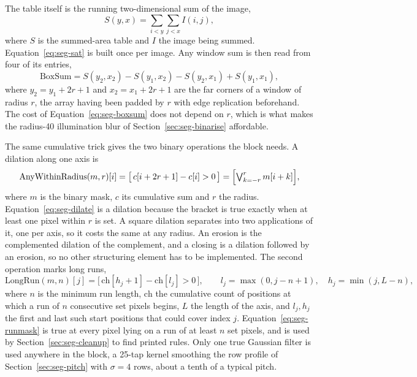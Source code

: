 The table itself is the running two-dimensional sum of the image,
\begin{equation}
S(y,x)=\sum_{i<y}\sum_{j<x} I(i,j),
\label{eq:seg-sat}
\end{equation}
where $S$ is the summed-area table and $I$ the image being summed. Equation~\ref{eq:seg-sat} is built once per image. Any window sum is then read from four of its entries,
\begin{equation}
\mathrm{BoxSum}=S(y_2,x_2)-S(y_1,x_2)-S(y_2,x_1)+S(y_1,x_1),
\label{eq:seg-boxsum}
\end{equation}
where $y_2=y_1+2r+1$ and $x_2=x_1+2r+1$ are the far corners of a window of radius $r$, the array having been padded by $r$ with edge replication beforehand. The cost of Equation~\ref{eq:seg-boxsum} does not depend on $r$, which is what makes the radius-40 illumination blur of Section~\ref{sec:seg-binarise} affordable.

The same cumulative trick gives the two binary operations the block needs. A dilation along one axis is
\begin{equation}
\mathrm{AnyWithinRadius}(m,r)[i]=\bigl[\,c[i+2r+1]-c[i]>0\,\bigr]=\Bigl[\textstyle\bigvee_{k=-r}^{r} m[i+k]\Bigr],
\label{eq:seg-dilate}
\end{equation}
where $m$ is the binary mask, $c$ its cumulative sum and $r$ the radius. Equation~\ref{eq:seg-dilate} is a dilation because the bracket is true exactly when at least one pixel within $r$ is set. A square dilation separates into two applications of it, one per axis, so it costs the same at any radius. An erosion is the complemented dilation of the complement, and a closing is a dilation followed by an erosion, so no other structuring element has to be implemented. The second operation marks long runs,
\begin{equation}
\mathrm{LongRun}(m,n)[j]=\bigl[\,\mathrm{ch}[h_j+1]-\mathrm{ch}[l_j]>0\,\bigr],\qquad l_j=\max(0,j-n+1),\quad h_j=\min(j,L-n),
\label{eq:seg-runmask}
\end{equation}
where $n$ is the minimum run length, $\mathrm{ch}$ the cumulative count of positions at which a run of $n$ consecutive set pixels begins, $L$ the length of the axis, and $l_j,h_j$ the first and last such start positions that could cover index $j$. Equation~\ref{eq:seg-runmask} is true at every pixel lying on a run of at least $n$ set pixels, and is used by Section~\ref{sec:seg-cleanup} to find printed rules. Only one true Gaussian filter is used anywhere in the block, a 25-tap kernel smoothing the row profile of Section~\ref{sec:seg-pitch} with $\sigma=4$ rows, about a tenth of a typical pitch.

